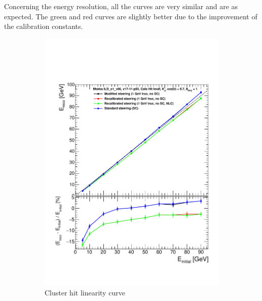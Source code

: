 Concerning the energy resolution, all the curves are very similar and are as expected. The green and red curves are slightly better due to the improvement of the calibration constants.\\

\begin{figure}[htbp!]
  \centering
  \begin{subfigure}[t]{0.45\textwidth}
    \centering
    \includegraphics[width=1\linewidth]{../Thesis_Plots/ILD/NoSmearing/Plots_Comparison/Comparison_linearity_Curves_Hits}
    \caption{Cluster hit linearity curve} \label{fig:linhits}
  \end{subfigure}
  \hfill
  \begin{subfigure}[t]{0.45\textwidth}
    \centering

\end{subfigure}
\end{figure}
